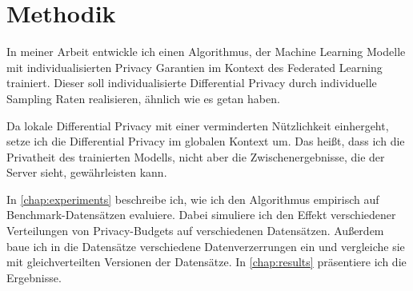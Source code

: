 \chapter{Methodik}\label{chap:methods}

	

In meiner Arbeit entwickle ich einen Algorithmus, der Machine Learning Modelle mit individualisierten Privacy Garantien im Kontext des Federated Learning trainiert. Dieser soll individualisierte Differential Privacy durch individuelle Sampling Raten realisieren, ähnlich wie es \textcite{jorgensen:2015, boenisch:2023} getan haben.

Da lokale Differential Privacy mit einer verminderten Nützlichkeit einhergeht, setze ich die Differential Privacy im globalen Kontext um. Das heißt, dass ich die Privatheit des trainierten Modells, nicht aber die Zwischenergebnisse, die der Server sieht, gewährleisten kann.

In \autoref{chap:experiments} beschreibe ich, wie ich den Algorithmus empirisch auf Benchmark-Datensätzen evaluiere. Dabei simuliere ich den Effekt verschiedener Verteilungen von Privacy-Budgets auf verschiedenen Datensätzen. Außerdem baue ich in die Datensätze verschiedene Datenverzerrungen ein und vergleiche sie mit gleichverteilten Versionen der Datensätze. In \autoref{chap:results} präsentiere ich die Ergebnisse.

